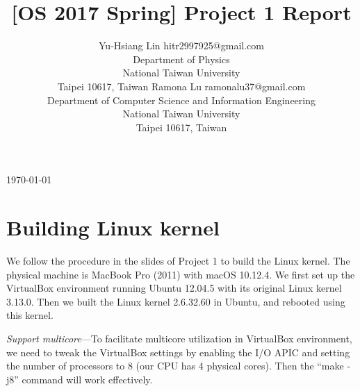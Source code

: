 \documentclass[twoside, 11pt, tablecaption=bottom]{article}
\begin{document}
\today

\title{[OS 2017 Spring] Project 1 Report}

\author{%
	\name Yu-Hsiang Lin \email hitr2997925@gmail.com \\
	\addr Department of Physics\\
	National Taiwan University\\
	Taipei 10617, Taiwan
	\AND
	\name Ramona Lu \email ramonalu37@gmail.com \\
	\addr Department of Computer Science and Information Engineering\\
	National Taiwan University\\
	Taipei 10617, Taiwan
}


\maketitle










\section{Building Linux kernel}

	We follow the procedure in the slides of Project 1 to build the Linux kernel. The physical machine is MacBook Pro (2011) with macOS 10.12.4. We first set up the VirtualBox environment running Ubuntu 12.04.5 with its original Linux kernel 3.13.0. Then we built the Linux kernel 2.6.32.60 in Ubuntu, and rebooted using this kernel.
	
	\emph{Support multicore}---To facilitate multicore utilization in VirtualBox environment, we need to tweak the VirtualBox settings by enabling the I/O APIC and setting the number of processors to 8 (our CPU has 4 physical cores). Then the ``make -j8'' command will work effectively.
	
\end{document}
